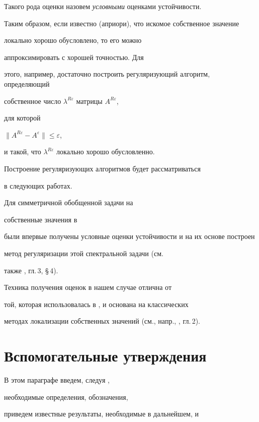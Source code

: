 Такого рода оценки назовем {\it условными} оценками устойчивости.





Таким образом, если известно (априори), что искомое собственное значение


локально хорошо обусловлено, то его можно


аппроксимировать с хорошей точностью. Для


этого, например, достаточно построить регуляризующий алгоритм, определяющий


собственное число $\lambda^{R\varepsilon}$ матрицы $A^{R\varepsilon}$,


для которой


$\|A^{R\varepsilon}-A^{\varepsilon}\|\le \varepsilon$,


и такой, что $\lambda^{R\varepsilon}$ локально хорошо обусловленно. 


Построение регуляризующих алгоритмов будет рассматриваться


в следующих работах.





Для симметричной обобщенной задачи на 


собственные значения в \cite{LK}


были впервые получены условные оценки устойчивости и на их основе построен


метод регуляризации этой спектральной задачи (см.


также \cite{LVA}, гл.\,3, \S\,4).


Техника получения оценок в нашем случае отлична от


той, которая использовалась в \cite{LK}, и основана на классических


методах локализации собственных значений (см., напр., \cite{LI}, гл.\,2).





\section{Вспомогательные утверждения}





В этом параграфе введем, следуя \cite{LI}, 


необходимые определения, обозначения,


приведем известные результаты, необходимые в дальнейшем, и


